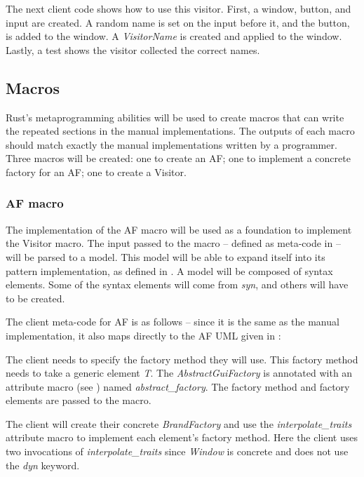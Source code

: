 The next client code shows how to use this visitor.
First, a window, button, and input are created.
A random name is set on the input before it, and the button, is added to the window.
A \textit{VisitorName} is created and applied to the window.
Lastly, a test shows the visitor collected the correct names.


\subsection{Macros}
Rust's metaprogramming abilities will be used to create macros that can write the repeated sections in the manual implementations.
The outputs of each macro should match exactly the manual implementations written by a programmer.
Three macros will be created: one to create an AF; one to implement a concrete factory for an AF; one to create a Visitor.

\subsubsection{AF macro}
The implementation of the AF macro will be used as a foundation to implement the Visitor macro.
The input passed to the macro -- defined as meta-code in  -- will be parsed to a model.
This model will be able to expand itself into its pattern implementation, as defined in .
A model will be composed of syntax elements.
Some of the syntax elements will come from \textit{syn}, and others will have to be created.

The client meta-code for AF is as follows -- since it is the same as the manual implementation, it also maps directly to the AF UML given in :


The client needs to specify the factory method they will use.
This factory method needs to take a generic element \textit{T}.
The \textit{AbstractGuiFactory} is annotated with an attribute macro (see ) named \textit{abstract\_factory}.
The factory method and factory elements are passed to the macro.

The client will create their concrete \textit{BrandFactory} and use the \textit{interpolate\_traits} attribute macro to implement each element's factory method.
Here the client uses two invocations of \textit{interpolate\_traits} since \textit{Window} is concrete and does not use the \textit{dyn} keyword.

